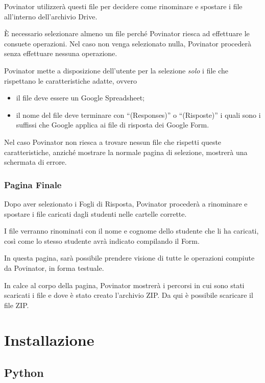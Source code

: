 \documentclass[12pt]{report}
\begin{document}
Povinator utilizzerà questi file per decidere come rinominare e spostare i file all'interno dell'archivio Drive.

È necessario selezionare almeno un file perché Povinator riesca ad effettuare le consuete operazioni. Nel caso non venga selezionato nulla, Povinator procederà senza effettuare nessuna operazione.

Povinator mette a disposizione dell'utente per la selezione \emph{solo} i file che rispettano le caratteristiche adatte, ovvero

\begin{itemize}
\item
  il file deve essere un Google Spreadsheet;
\item
  il nome del file deve terminare con ``(Responses)'' o ``(Risposte)'' i
  quali sono i suffissi che Google applica ai file di risposta dei
  Google Form.
\end{itemize}

Nel caso Povinator non riesca a trovare nessun file che rispetti queste caratteristiche, anziché mostrare la normale pagina di selezione, mostrerà una schermata di errore.

\subsection{Pagina Finale}\label{pagina-finale}

Dopo aver selezionato i Fogli di Risposta, Povinator procederà a rinominare e spostare i file caricati dagli studenti nelle cartelle corrette.

I file verranno rinominati con il nome e cognome dello studente che li ha caricati, così come lo stesso studente avrà indicato compilando il Form.

In questa pagina, sarà possibile prendere visione di tutte le operazioni compiute da Povinator, in forma testuale.

In calce al corpo della pagina, Povinator mostrerà i percorsi in cui sono stati scaricati i file e dove è stato creato l'archivio ZIP.
Da qui è possibile scaricare il file ZIP.


\chapter{Installazione}\label{installazione}

\section{Python}\label{python}
\end{document}
